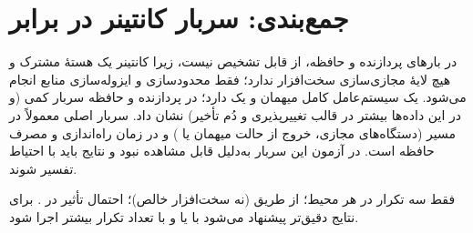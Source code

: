 \section{جمع‌بندی: سربار کانتینر در برابر }
در بارهای پردازنده و حافظه،  از  قابل تشخیص نیست، زیرا کانتینر یک هستهٔ مشترک و هیچ لایهٔ مجازی‌سازی سخت‌افزار ندارد؛ فقط محدودسازی و ایزوله‌سازی منابع انجام می‌شود.  یک سیستم‌عامل کامل میهمان و یک  دارد؛ در پردازنده و حافظه سربار کمی (و در این داده‌ها بیشتر در قالب تغییرپذیری و دُم تأخیر) نشان داد. سربار اصلی  معمولاً در مسیر  (دستگاه‌های مجازی، خروج از حالت میهمان یا ) و در زمان راه‌اندازی و مصرف حافظه است. در آزمون  این سربار به‌دلیل  قابل مشاهده نبود و نتایج باید با احتیاط تفسیر شوند.

\begin{notebox}[محدودیت‌ها]
فقط سه تکرار در هر محیط؛  از طریق  (نه سخت‌افزار خالص)؛ احتمال تأثیر  در . برای نتایج دقیق‌تر پیشنهاد می‌شود  با  یا  و با تعداد تکرار بیشتر اجرا شود.
\end{notebox}
